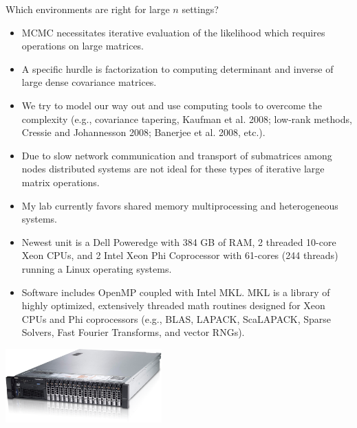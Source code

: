 \documentclass[10pt, xcolor=table]{beamer}
\newcommand{\blue}[1]{{\color{RoyalBlue!90} #1}}
\newcommand{\red}[1]{{\color{Red} #1}}
\begin{document}
\begin{frame}
Which environments are right for large $n$ settings?
\begin{itemize}\setlength{\itemsep}{0.2cm}
\item MCMC necessitates iterative evaluation of the likelihood which requires
operations on large matrices.
\item A specific hurdle is \blue{factorization} to computing determinant and
inverse of large dense covariance matrices.
\item We try to model our way out and use computing tools to overcome the complexity (e.g.,
covariance tapering, Kaufman et al. 2008; low-rank methods,
Cressie and Johannesson 2008; Banerjee et al. 2008, etc.).
\item Due to \red{slow network communication} and transport of
submatrices among nodes distributed systems are not ideal for
these types of iterative large matrix operations.
\end{itemize}
\end{frame}


\begin{frame}
\begin{itemize}\setlength{\itemsep}{0.2cm}
\item My lab currently favors \blue{shared memory multiprocessing} and \blue{heterogeneous} systems.

\item Newest unit is a Dell Poweredge with 384 GB of RAM, 2 threaded 10-core Xeon CPUs, and 2 Intel Xeon Phi Coprocessor with 61-cores (244 threads) running a Linux operating systems.

\item Software includes OpenMP coupled with Intel MKL. MKL is a library of highly optimized, extensively threaded math routines designed for Xeon CPUs and Phi coprocessors (e.g., BLAS, LAPACK, ScaLAPACK, Sparse Solvers, Fast Fourier Transforms, and vector RNGs).
\end{itemize}
\begin{center}
\includegraphics[width=6cm]{figures/poweredge.png}
\end{center}
\end{frame}
\end{document}
